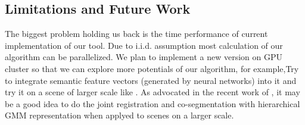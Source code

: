 \subsection{Limitations and Future Work}
The biggest problem holding us back is the time performance of current implementation of our tool.  Due to i.i.d. assumption most calculation of our algorithm can be parallelized. We plan to implement a new version on GPU cluster so that we can explore more potentials of our algorithm, for example,Try to integrate semantic feature vectors (generated by neural networks) into it and try it on a scene of larger scale like \cite{GOGMA}. As advocated in the recent work of \cite{AGM}, it may be a good idea to do the joint registration and co-segmentation with hierarchical GMM representation when applyed to scenes on a larger scale. 